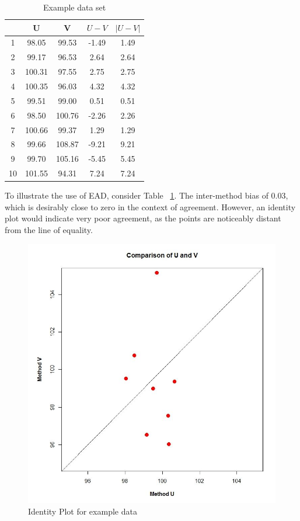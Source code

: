 \documentclass[12pt, a4paper]{report}
\theoremstyle{plain}
\theoremstyle{definition}
\theoremstyle{remark}
\begin{document}
\begin{table}[ht]
	\centering
	\begin{tabular}{|c|c|c|c|c|}
		\hline
		& U & V & $U-V$ & $|U-V|$ \\ 
		\hline
		1 & 98.05 & 99.53 & -1.49 & 1.49 \\ 
		2 & 99.17 & 96.53 & 2.64 & 2.64 \\ 
		3 & 100.31 & 97.55 & 2.75 & 2.75 \\ 
		4 & 100.35 & 96.03 & 4.32 & 4.32 \\ 
		5 & 99.51 & 99.00 & 0.51 & 0.51 \\ 
		6 & 98.50 & 100.76 & -2.26 & 2.26 \\ 
		7 & 100.66 & 99.37 & 1.29 & 1.29 \\ 
		8 & 99.66 & 108.87 & -9.21 & 9.21 \\ 
		9 & 99.70 & 105.16 & -5.45 & 5.45 \\ 
		10 & 101.55 & 94.31 & 7.24 & 7.24 \\ 
		\hline
	\end{tabular}
	\caption{Example data set}
	\label{EADdata}
\end{table}

To illustrate the use of EAD, consider Table ~\ref{EADdata}. The inter-method bias of 0.03, which is desirably close to zero in the context of agreement. However, an identity plot would indicate very poor agreement, as the points are noticeably distant from the line of equality.
\begin{figure}
	\centering
	\includegraphics[width=0.5\linewidth]{EAD-UV}
	\caption{Identity Plot for example data}
	\label{fig:EADidentity}
\end{figure}
\end{document}
